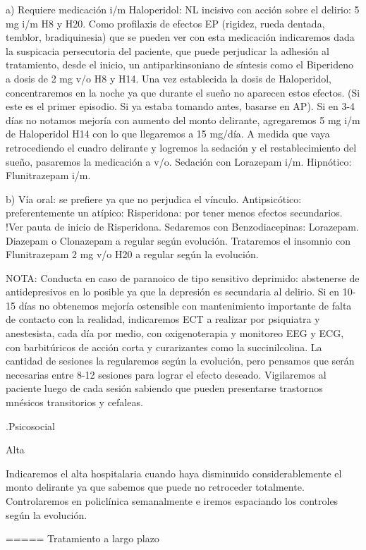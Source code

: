 \documentclass{scrbook}
\begin{document}
a) Requiere medicación i/m Haloperidol: NL incisivo con acción sobre el delirio: 5 mg i/m H8 y H20. Como profilaxis de efectos EP (rigidez, rueda dentada, temblor, bradiquinesia) que se pueden ver con esta medicación indicaremos dada la suspicacia persecutoria del paciente, que puede perjudicar la adhesión al tratamiento, desde el inicio, un antiparkinsoniano de síntesis como el Biperideno a dosis de 2 mg v/o H8 y H14. Una vez establecida la dosis de Haloperidol, concentraremos en la noche ya que durante el sueño no aparecen estos efectos. (Si este es el primer episodio. Si ya estaba tomando antes, basarse en AP). Si en 3-4 días no notamos mejoría con aumento del monto delirante, agregaremos 5 mg i/m de Haloperidol H14 con lo que llegaremos a 15 mg/día. A medida que vaya retrocediendo el cuadro delirante y logremos la sedación y el restablecimiento del sueño, pasaremos la medicación a v/o. Sedación con Lorazepam i/m. Hipnótico: Flunitrazepam i/m.

b) Vía oral: se prefiere ya que no perjudica el vínculo. Antipsicótico: preferentemente un atípico: Risperidona: por tener menos efectos secundarios. !Ver pauta de inicio de Risperidona. Sedaremos con Benzodiacepinas: Lorazepam. Diazepam o Clonazepam a regular según evolución. Trataremos el insomnio con Flunitrazepam 2 mg v/o H20 a regular según la evolución.

NOTA: Conducta en caso de paranoico de tipo sensitivo deprimido: abstenerse de antidepresivos en lo posible ya que la depresión es secundaria al delirio. Si en 10-15 días no obtenemos mejoría ostensible con mantenimiento importante de falta de contacto con la realidad, indicaremos ECT a realizar por psiquiatra y anestesista, cada día por medio, con oxigenoterapia y monitoreo EEG y ECG, con barbitúricos de acción corta y curarizantes como la succinilcolina. La cantidad de sesiones la regularemos según la evolución, pero pensamos que serán necesarias entre 8-12 sesiones para lograr el efecto deseado. Vigilaremos al paciente luego de cada sesión sabiendo que pueden presentarse trastornos mnésicos transitorios y cefaleas.

.Psicosocial


Alta

Indicaremos el alta hospitalaria cuando haya disminuido considerablemente el monto delirante ya que sabemos que puede no retroceder totalmente. Controlaremos en policlínica semanalmente e iremos espaciando los controles según la evolución.

===== Tratamiento a largo plazo
\end{document}

